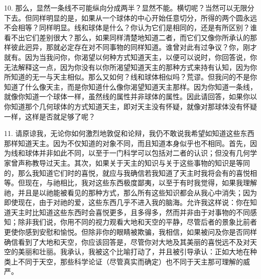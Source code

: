10. 那么，显然一条线不可能纵向分成两半？显然不能。横切呢？当然可以无限分下去。但同样明显的是，如果从一个球体的中心开始任意切分，所得的两个圆永远不会相等？同样明显。线和球体是什么？你认为它们是相同的，还是有所区别？谁看不出它们差别很大？那么，如果同样清楚地知道二者，而它们又像你所承认的那样彼此迥异，那就必定存在对不同事物的同样知道。谁曾对此有过争议？你，刚才就有。因为当我问你，你渴望以何种方式知道天主，以便可以说时，你回答说，你无法解释这一点，因为你没有以你所渴望知道天主的那种方式来持有认知，因为你所知道的无一与天主相似。那么又如何？线和球体相似吗？荒谬。但我问的不是你知道了什么像天主，而是你知道什么像你渴望知道天主那样。因为你知道一条线，就像你知道一个球体一样，虽然线的属性并非球体的属性。因此请回答，如果你以你知道那个几何球体的方式知道天主，即对天主没有怀疑，就像对那球体没有怀疑一样，这样是否就足够了呢？\par

11. 请原谅我，无论你如何激烈地敦促和论辩，我仍不敢说我希望如知道这些东西那样知道天主。因为不仅知道的对象不同，而且知道本身似乎也不相同。首先，因为线和球体并非如此不同，以至于一门科学可以包括对二者的认识；但没有几何学家曾声称教导过天主。其次，如果关于天主的知识与关于这些事物的知识是等同的，那么我知道它们时的喜悦，就应与我确信若我知道了天主时我将会有的喜悦相等。但现在，与祂相比，我对这些东西极度鄙夷，以至于有时我觉得，如果我理解祂，并且是以祂能被看见的那种方式，那么所有这些知识都会从我心中消失；因为即使现在，由于对祂的爱，这些东西几乎不进入我的脑海。允许我这样说：你在知道天主时比知道这些东西时会喜悦更多，且多得多，然而并非由于对事物的不同感知；除非我们说，你用不同的视力观看大地和天空的平静，尽管后者的景象比前者更使你感到安慰和愉悦。但除非你的眼睛被欺骗，我相信，如果被问及你是否同样确信看到了大地和天空，你应该回答是，尽管你对大地及其美丽的喜悦远不及对天空的美丽和壮丽。我承认，我被这个比喻打动了，并且被引导承认：正如大地在种类上不同于天空，那些科学论证（尽管真实而确定）也不同于天主那可理解的威严。\par

